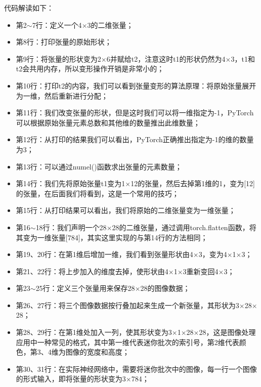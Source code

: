 \documentclass[UTF8]{article}
\begin{document}
代码解读如下：
\begin{itemize}
\item 第2$\sim$7行：定义一个4$\times$3的二维张量；
\item 第8行：打印张量的原始形状；
\item 第9行：将张量的形状变为2$\times$6并赋给t2，注意这时t1的形状仍然为4$\times$3，t1和t2会共用内存，所以变形操作开销是非常小的；
\item 第10行：打印t2的内容，我们可以看到张量变形的算法原理：将原始张量展开为一维，然后重新进行分配；
\item 第11行：我们改变张量的形状，但是这时我们可以将一维指定为-1，PyTorch可以根据原始张量元素总数和其他维的数量推出此维数量；
\item 第12行：从打印的结果我们可以看出，PyTorch正确推出指定为-1的维的数量为3；
\item 第13行：可以通过numel()函数求出张量的元素数量；
\item 第14行：我们先将原始张量t1变为1$\times$12的张量，然后去掉第1维的1，变为[12]的张量，在后面我们将看到，这是一个常用的技巧；
\item 第15行：从打印结果可以看出，我们将原始的二维张量变为一维张量；
\item 第16$\sim$18行：我们声明一个28$\times$28的二维张量，通过调用torch.flatten函数，将其变为一维张量[784]，其实这里实现的与第14行的方法相同；
\item 第19、20行：在第1维后增加一维，我们看到张量形状由4$\times$3，变为4$\times$1$\times$3；
\item 第21、22行：将上步加入的维度去掉，使形状由4$\times$1$\times$3重新变回4$\times$3；
\item 第23$\sim$25行：定义三个张量用来保存28$\times$28的图像数据；
\item 第26、27行：将三个图像数据按行叠加起来生成一个新张量，其形状为3$\times$28$\times$28；
\item 第28、29行：在第1维处加入一列，使其形状变为3$\times$1$\times$28$\times$28，这是图像处理应用中一种常见的格式，其中第一维代表迷你批次的索引号，第2维代表颜色，第3、4维为图像的宽度和高度；
\item 第30、31行：在实际神经网络中，需要将迷你批次中的图像，每一行一个图像的形式输入，即将张量的形状变为3$\times$784；
\end{itemize}
\end{document}
